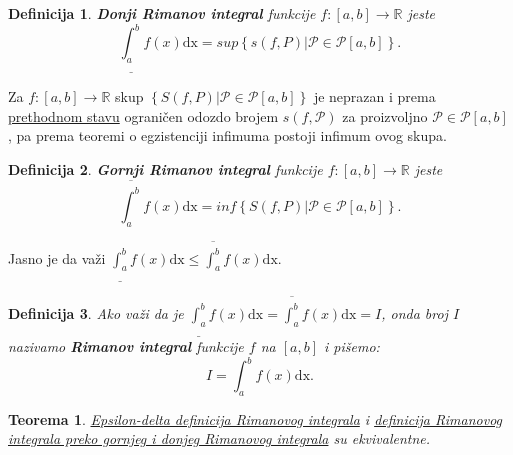 \documentclass{article}
\newtheorem{definicija}{Definicija}[section]
\newtheorem{teorema}{Teorema}[section]
\begin{document}
\begin{defbox}
    \label{definicija_2.6}
    \begin{definicija}
        \textbf{Donji Rimanov integral} funkcije $f: \left[a,b\right]\longrightarrow\mathbb{R}$ jeste
        $$\underline{\int_{a}^{b}}f\left(x\right)\text{dx}=sup\left\{s\left(f,P\right)\big|\mathcal{P}\in\mathcal{P}\left[a,b\right]\right\}.$$
    \end{definicija}
\end{defbox}

Za $f: \left[a,b\right]\longrightarrow\mathbb{R}$ skup $\left\{S\left(f,P\right)\big|\mathcal{P}\in\mathcal{P}\left[a,b\right]\right\}$
je neprazan i prema \hyperref[stav_2.2]{prethodnom stavu} ograničen odozdo brojem $s\left(f,\mathcal{P}\right)$ za proizvoljno $\mathcal{P}\in\mathcal{P}\left[a,b\right]$,
pa prema teoremi o egzistenciji infimuma postoji infimum ovog
skupa.

\begin{defbox}
    \label{definicija_2.7}
    \begin{definicija}
        \textbf{Gornji Rimanov integral} funkcije $f: \left[a,b\right]\longrightarrow\mathbb{R}$ jeste
        $$\overline{\int_{a}^{b}}f\left(x\right)\text{dx}=inf\left\{S\left(f,P\right)\big|\mathcal{P}\in\mathcal{P}\left[a,b\right]\right\}.$$
    \end{definicija}
\end{defbox}

Jasno je da važi $\displaystyle\underline{\int_{a}^{b}}f\left(x\right)\text{dx}\leq\overline{\int_{a}^{b}}f\left(x\right)\text{dx}$.

\begin{defbox}
    \label{definicija_2.8}
    \begin{definicija}
        Ako važi da je $\displaystyle\underline{\int_{a}^{b}}f\left(x\right)\text{dx}=\overline{\int_{a}^{b}}f\left(x\right)\text{dx}=I$,
        onda broj $I$ nazivamo \textbf{Rimanov integral} funkcije $f$ na $\left[a,b\right]$ i pišemo:
        $$I=\int_{a}^{b}f\left(x\right)\text{dx}.$$
    \end{definicija}
\end{defbox}

\begin{teoremabox}
    \label{teorema_2.2}
    \begin{teorema}
        \hyperref[definicija_2.3]{Epsilon-delta definicija Rimanovog integrala} i \hyperref[definicija_2.8]{definicija Rimanovog integrala preko gornjeg i donjeg Rimanovog integrala}
        su ekvivalentne.
    \end{teorema}
\end{teoremabox}
\end{document}
